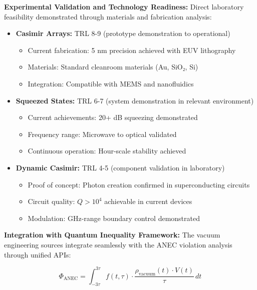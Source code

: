\documentclass[11pt]{article}
\begin{document}
\textbf{Experimental Validation and Technology Readiness:}
Direct laboratory feasibility demonstrated through materials and fabrication analysis:

\begin{itemize}
    \item \textbf{Casimir Arrays:} TRL 8-9 (prototype demonstration to operational)
    \begin{itemize}
        \item Current fabrication: 5 nm precision achieved with EUV lithography
        \item Materials: Standard cleanroom materials (Au, SiO₂, Si)
        \item Integration: Compatible with MEMS and nanofluidics
    \end{itemize}
    
    \item \textbf{Squeezed States:} TRL 6-7 (system demonstration in relevant environment)
    \begin{itemize}
        \item Current achievements: 20+ dB squeezing demonstrated
        \item Frequency range: Microwave to optical validated
        \item Continuous operation: Hour-scale stability achieved
    \end{itemize}
    
    \item \textbf{Dynamic Casimir:} TRL 4-5 (component validation in laboratory)
    \begin{itemize}
        \item Proof of concept: Photon creation confirmed in superconducting circuits
        \item Circuit quality: $Q > 10^4$ achievable in current devices
        \item Modulation: GHz-range boundary control demonstrated
    \end{itemize}
\end{itemize}

\textbf{Integration with Quantum Inequality Framework:}
The vacuum engineering sources integrate seamlessly with the ANEC violation analysis through unified APIs:

\begin{equation}
\Phi_{\text{ANEC}} = \int_{-3\tau}^{3\tau} f(t,\tau) \cdot \frac{\rho_{\text{vacuum}}(t) \cdot V(t)}{\tau} \, dt
\end{equation}
\end{document}
